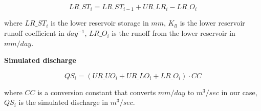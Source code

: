 \begin{fleqn}
\begin{equation}
LR\_ST_i = LR\_ST_{i-1}  + UR\_LR_i - LR\_O_i
\end{equation}

where $LR\_ST_i$ is the lower reservoir storage in $mm$, $K_{ll}$ is the lower reservoir runoff coefficient in $day^{-1}$, $LR\_O_i$ is the runoff from the lower reservoir in $mm/day$.

\bigskip
\textbf{Simulated discharge}

\begin{equation}
QS_i = (UR\_UO_i + UR\_LO_i + LR\_O_i) \cdot CC
\end{equation}

where $CC$ is a conversion constant that converts $mm/day$ to $m^3/sec$ in our case, $QS_i$ is the simulated discharge in $m^3/sec$.

\end{fleqn}
